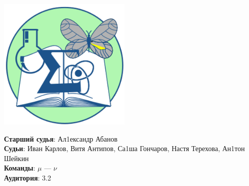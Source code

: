 \documentclass[12pt]{article}
\begin{document}
\begin{minipage}{.30\textwidth}
\begin{center}
\includegraphics[width=0.48\textwidth]{klshlogo.pdf}
\end{center}
\end{minipage}
\begin{minipage}{.65\textwidth}
\begin{flushleft}
{\bf Старший судья}: Ал1ександр Абанов\\ 
{\bf Судьи}: Иван Карлов, Витя Антипов, Са1ша Гончаров, Настя Терехова, Ан1тон Шейкин\\ 
{\bf Команды}: $\mu$ --- $\nu$\\ 
{\bf Аудитория}: 3.2\\ 
\end{flushleft}
\end{minipage}
\end{document}
